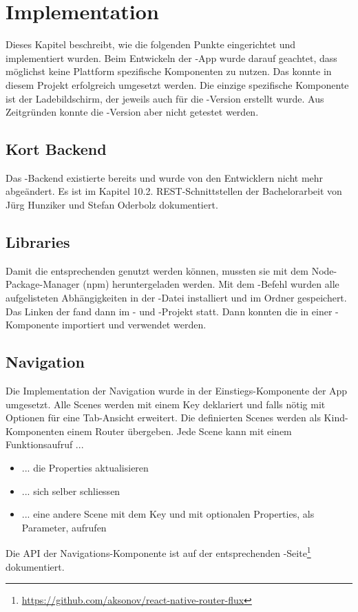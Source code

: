 \chapter{Implementation}
\label{pd-implementation}
Dieses Kapitel beschreibt, wie die folgenden Punkte eingerichtet und implementiert wurden. 
Beim Entwickeln der -App wurde darauf geachtet, dass möglichst keine Plattform spezifische Komponenten zu nutzen. 
Das konnte in diesem Projekt erfolgreich umgesetzt werden. 
Die einzige spezifische Komponente ist der Ladebildschirm, der jeweils auch für die -Version erstellt wurde.
Aus Zeitgründen konnte die -Version aber nicht getestet werden. 


\section{Kort Backend}
Das \kort{}-Backend existierte bereits und wurde von den Entwicklern nicht mehr abgeändert. 
Es ist im Kapitel 10.2. \gls{REST}-Schnittstellen der Bachelorarbeit von Jürg Hunziker und Stefan Oderbolz dokumentiert.\cite{ba-kort-2012}


\section{Libraries}
Damit die entsprechenden  genutzt werden können, mussten sie mit dem Node-Package-Manager (npm) heruntergeladen werden. 
Mit dem -Befehl wurden alle aufgelisteten Abhängigkeiten in der  -Datei installiert und im Ordner \newline{} gespeichert.
Das Linken der  fand dann im - und -Projekt statt. 
Dann konnten die  in einer -Komponente importiert und verwendet werden. 


\section{Navigation}
Die Implementation der Navigation wurde in der Einstiegs-Komponente der App umgesetzt. 
Alle Scenes werden mit einem Key deklariert und falls nötig mit Optionen für eine Tab-Ansicht erweitert. 
Die definierten Scenes werden als Kind-Komponenten einem Router übergeben. 
Jede Scene kann mit einem Funktionsaufruf ...
\begin{itemize}
	\item ... die Properties aktualisieren
	\item ... sich selber schliessen
	\item ... eine andere Scene mit dem Key und mit optionalen Properties, als Parameter, aufrufen
\end{itemize} 
Die \gls{API} der Navigations-Komponente ist auf der entsprechenden -Seite\footnote{\url{https://github.com/aksonov/react-native-router-flux}} dokumentiert. 


